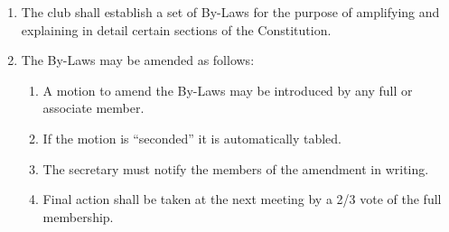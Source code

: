 \documentclass[
]{article}
\providecommand{\tightlist}{%
  \setlength{\itemsep}{0pt}\setlength{\parskip}{0pt}}
\begin{document}
\begin{enumerate}
\def\labelenumi{\arabic{enumi}.}
\tightlist
\item
  The club shall establish a set of By-Laws for the purpose of
  amplifying and explaining in detail certain sections of the
  Constitution.
\item
  The By-Laws may be amended as follows:

  \begin{enumerate}
  \def\labelenumii{\Alph{enumii}.}
  \tightlist
  \item
    A motion to amend the By-Laws may be introduced by any full or
    associate member.
  \item
    If the motion is ``seconded'' it is automatically tabled.
  \item
    The secretary must notify the members of the amendment in writing.
  \item
    Final action shall be taken at the next meeting by a 2/3 vote of the
    full membership.
  \end{enumerate}
\end{enumerate}
\end{document}
